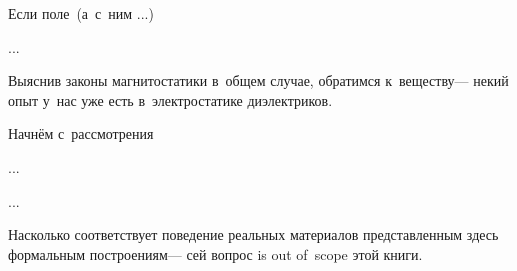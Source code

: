 

\begin{otherlanguage}{russian}

Если поле~(а~с~ним ...)

...



\end{otherlanguage}



\begin{otherlanguage}{russian}

Выяснив законы магнитостатики в~общем случае, обратимся к~веществу\:--- некий опыт у~нас уже есть в~электростатике ди\-элект\-ри\-ков.

Начнём с~рассмотрения

...



...

Насколько соответствует поведение реальных материалов представленным здесь формальным построениям\:--- сей вопрос is out of~scope этой книги.

\end{otherlanguage}



